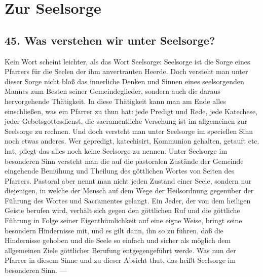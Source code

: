 \chapter{Zur Seelsorge}

\section{45. Was verstehen wir unter Seelsorge?}

Kein Wort scheint leichter, als das Wort Seelsorge: Seelsorge ist die Sorge eines Pfarrers für die Seelen der ihm anvertrauten Heerde. Doch versteht man unter dieser
Sorge nicht bloß das innerliche Denken und Sinnen eines seelsorgenden Mannes zum Besten seiner Gemeindeglieder, sondern auch die daraus hervorgehende Thätigkeit. In diese Thätigkeit kann man am Ende alles einschließen, was ein Pfarrer zu thun hat: jede Predigt und Rede, jede Katechese, jeder Gebetsgottesdienst, die sacramentliche Versehung ist im allgemeinen zur Seelsorge zu rechnen. Und doch versteht man unter Seelsorge im speciellen Sinn noch etwas anderes. Wer gepredigt, katechisirt, Kommunion gehalten, getauft etc. hat, pflegt das alles noch keine Seelsorge zu nennen. Unter Seelsorge im besonderen Sinn versteht man die auf die pastoralen Zustände der Gemeinde eingehende Bemühung und Theilung des göttlichen Wortes von Seiten des Pfarrers. Pastoral aber nennt man nicht jeden Zustand einer Seele, sondern nur diejenigen, in welche der Mensch auf dem Wege der Heilsordnung gegenüber der Führung des Wortes und Sacramentes gelangt. Ein Jeder, der von dem heiligen Geiste berufen wird, verhält sich gegen den göttlichen Ruf und die göttliche Führung in Folge seiner Eigenthümlichkeit auf eine eigne Weise, bringt seine besondern Hindernisse mit, und es gilt dann, ihn so zu führen, daß die Hindernisse gehoben und die Seele so einfach und sicher als möglich dem allgemeinen Ziele göttlicher Berufung entgegengeführt werde. Was nun der Pfarrer in diesem Sinne und zu dieser Absicht thut, das heißt Seelsorge im besonderen Sinn. —

